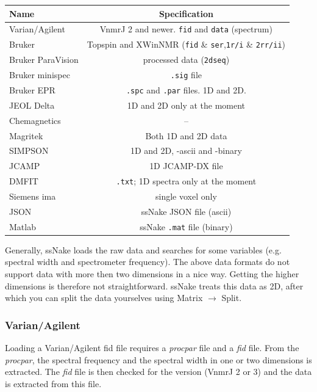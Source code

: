 \documentclass[11pt,a4paper]{article}
\begin{document}
\begin{center}
\begin{tabular}{lc}
\toprule
Name & Specification \\
\midrule
\rowcolor{gray!30!white}
Varian/Agilent & VnmrJ 2 and newer. \texttt{fid} and \texttt{data} (spectrum)\\
Bruker & Topspin and XWinNMR (\texttt{fid} \& \texttt{ser},\texttt{1r/i} \& \texttt{2rr/ii}) \\
\rowcolor{gray!30!white}
Bruker ParaVision & processed data (\texttt{2dseq})\\
Bruker minispec  & \texttt{.sig} file\\
\rowcolor{gray!30!white}
Bruker EPR & \texttt{.spc} and \texttt{.par} files. 1D and 2D.\\
JEOL Delta & 1D and 2D only at the moment \\
\rowcolor{gray!30!white}
Chemagnetics & -- \\
Magritek & Both 1D and 2D data \\
\rowcolor{gray!30!white}
SIMPSON & 1D and 2D, -ascii and -binary \\
JCAMP & 1D JCAMP-DX file\\
\rowcolor{gray!30!white}
DMFIT & \texttt{.txt}; 1D spectra only at the moment\\
Siemens ima & single voxel only\\
\rowcolor{gray!30!white}
JSON & ssNake JSON file (ascii)\\
Matlab & ssNake \texttt{.mat} file (binary)\\
\bottomrule
\end{tabular}
\end{center}

Generally, ssNake loads the raw data and searches for some variables (e.g. spectral width and spectrometer frequency). The above data formats do not support data with more then two dimensions in a nice way. Getting the higher dimensions is therefore not straightforward. ssNake treats this data as 2D, after which you can split the data yourselves using Matrix $\rightarrow$ Split.

\subsubsection*{Varian/Agilent}
Loading a Varian/Agilent fid file requires a \textit{procpar} file and a \textit{fid} file. From the \textit{procpar}, the spectral frequency and the spectral width in one or two dimensions is extracted. The \textit{fid} file is then checked for the version (VnmrJ 2 or 3) and the data is extracted from this file.
\end{document}
